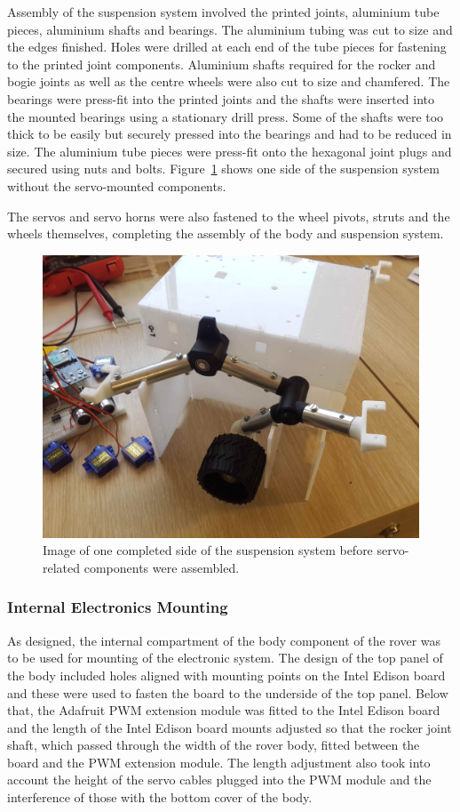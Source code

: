       Assembly of the suspension system involved the printed joints, aluminium tube pieces, aluminium shafts and bearings. The aluminium tubing was cut to size and the edges finished. Holes were drilled at each end of the tube pieces for fastening to the printed joint components. Aluminium shafts required for the rocker and bogie joints as well as the centre wheels were also cut to size and chamfered. The bearings were press-fit into the printed joints and the shafts were inserted into the mounted bearings using a stationary drill press. Some of the shafts were too thick to be easily but securely pressed into the bearings and had to be reduced in size. The aluminium tube pieces were press-fit onto the hexagonal joint plugs and secured using nuts and bolts. Figure~\ref{fig:mechBuild-completedSuspensionSide} shows one side of the suspension system without the servo-mounted components.
      
      The servos and servo horns were also fastened to the wheel pivots, struts and the wheels themselves, completing the assembly of the body and suspension system.
      
      \begin{figure}[h!]
        \centering
        \includegraphics[width=0.6\linewidth]{figures/mechBuild-completedSuspensionSide}
        \caption[Image of one completed side of the suspension system before servo-related components were assembled.]{Image of one completed side of the suspension system before servo-related components were assembled.}
        \label{fig:mechBuild-completedSuspensionSide}
      \end{figure}
      
    \subsubsection{Internal Electronics Mounting}
      As designed, the internal compartment of the body component of the rover was to be used for mounting of the electronic system. The design of the top panel of the body included holes aligned with mounting points on the Intel Edison board and these were used to fasten the board to the underside of the top panel. Below that, the Adafruit PWM extension module was fitted to the Intel Edison board and the length of the Intel Edison board mounts adjusted so that the rocker joint shaft, which passed through the width of the rover body, fitted between the board and the PWM extension module. The length adjustment also took into account the height of the servo cables plugged into the PWM module and the interference of those with the bottom cover of the body.
      
